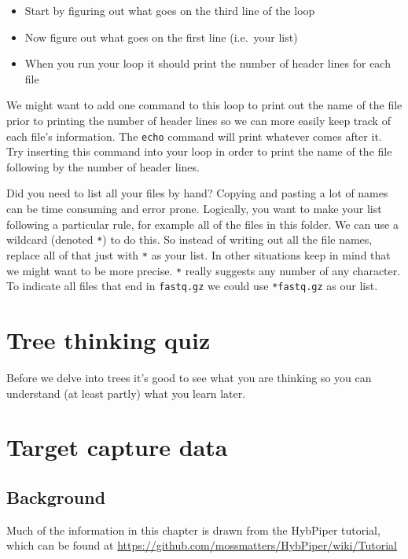 \documentclass[
]{book}
\providecommand{\tightlist}{%
  \setlength{\itemsep}{0pt}\setlength{\parskip}{0pt}}
\begin{document}
\begin{itemize}
\tightlist
\item
  Start by figuring out what goes on the third line of the loop
\item
  Now figure out what goes on the first line (i.e.~your list)
\item
  When you run your loop it should print the number of header lines for each file
\end{itemize}

We might want to add one command to this loop to print out the name of the file prior to printing the number of header lines so we can more easily keep track of each file's information. The \texttt{echo} command will print whatever comes after it. Try inserting this command into your loop in order to print the name of the file following by the number of header lines.

Did you need to list all your files by hand? Copying and pasting a lot of names can be time consuming and error prone. Logically, you want to make your list following a particular rule, for example all of the files in this folder. We can use a wildcard (denoted \texttt{*}) to do this. So instead of writing out all the file names, replace all of that just with \texttt{*} as your list.
In other situations keep in mind that we might want to be more precise.
\texttt{*} really suggests any number of any character.
To indicate all files that end in \texttt{fastq.gz} we could use \texttt{*fastq.gz} as our list.

\hypertarget{tree-thinking-quiz}{%
\chapter{Tree thinking quiz}\label{tree-thinking-quiz}}

Before we delve into trees it's good to see what you are thinking so you can understand (at least partly) what you learn later.

\hypertarget{target-capture-data}{%
\chapter{Target capture data}\label{target-capture-data}}

\hypertarget{background}{%
\section{Background}\label{background}}

Much of the information in this chapter is drawn from the HybPiper tutorial, which can be found at \url{https://github.com/mossmatters/HybPiper/wiki/Tutorial}
\end{document}
